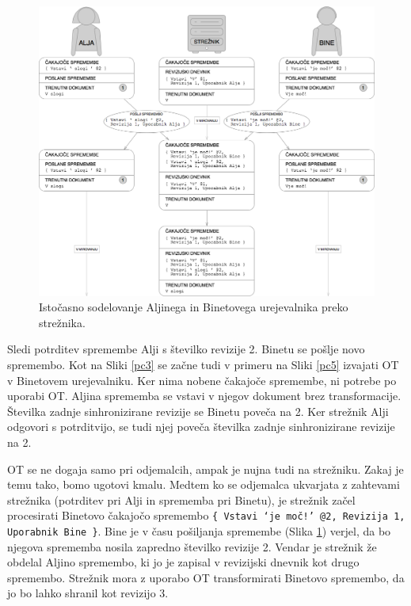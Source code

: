 \documentclass[a4paper, 12pt, twoside]{book}
\begin{document}
\begin{figure}[placement h]
\begin{center}
\includegraphics[width=14cm]{pc4.png}
\end{center}
\caption{Istočasno sodelovanje Aljinega in Binetovega urejevalnika preko strežnika.}
\label{pc4}
\end{figure}

Sledi potrditev spremembe Alji s številko revizije 2. Binetu se pošlje novo spremembo. Kot na Sliki \ref{pc3} se začne tudi v primeru na Sliki \ref{pc5} izvajati OT v Binetovem urejevalniku. Ker nima nobene čakajoče spremembe, ni potrebe po uporabi OT. Aljina sprememba se vstavi v njegov dokument brez transformacije. Številka zadnje sinhronizirane revizije se Binetu poveča na 2. Ker strežnik Alji odgovori s potrditvijo, se tudi njej poveča številka zadnje sinhronizirane revizije na 2.

\pagebreak

OT se ne dogaja samo pri odjemalcih, ampak je nujna tudi na strežniku. Zakaj je temu tako, bomo ugotovi kmalu. Medtem ko se odjemalca ukvarjata z zahtevami strežnika (potrditev pri Alji in sprememba pri Binetu), je strežnik začel procesirati \linebreak Binetovo čakajočo spremembo {\tt \{ Vstavi ‘je moč!’ @2, Revizija 1, Uporabnik \linebreak Bine \}}. Bine je v času pošiljanja spremembe (Slika \ref{pc4}) verjel, da bo njegova sprememba nosila zapredno številko revizije 2. Vendar je strežnik že obdelal Aljino spremembo, ki jo je zapisal v revizijski dnevnik kot drugo spremembo. Strežnik mora z uporabo OT transformirati Binetovo spremembo, da jo bo lahko shranil kot revizijo 3.
\end{document}
